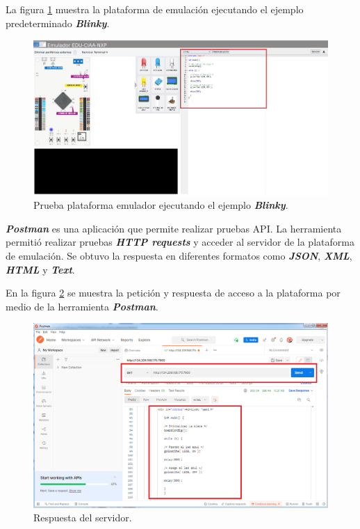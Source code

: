La figura \ref{fig:PlataformaEmuladorBlinky} muestra la plataforma de emulación ejecutando el ejemplo predeterminado \textit{\textbf{Blinky}}.

\begin{figure}[ht]
	\centering
	\includegraphics[scale=.21]{./Figures/PlataformaEmuladorBlinky.png}
	\caption{Prueba plataforma emulador ejecutando el ejemplo \textit{\textbf{Blinky}}.}
	\label{fig:PlataformaEmuladorBlinky}
\end{figure}

\textit{\textbf{Postman}} es una aplicación que permite realizar pruebas API. La herramienta permitió realizar pruebas \textit{\textbf{HTTP requests}} y acceder al servidor de la plataforma de emulación. Se obtuvo la respuesta en diferentes formatos como  \textit{\textbf{JSON}}, \textit{\textbf{XML}}, \textit{\textbf{HTML}} y \textit{\textbf{Text}}.


En la figura \ref{fig:PostmanBlinky2} se muestra la petición y respuesta de acceso a la plataforma por medio de la herramienta \textit{\textbf{Postman}}.

\hfill \break
\hfill \break
\hfill \break
\hfill \break
\hfill \break
\hfill \break
\hfill \break
\hfill \break
\hfill \break
\hfill \break

\begin{figure}[ht]
	\centering
	\includegraphics[scale=.40]{./Figures/PostmanBlinky2.png}
	\caption{Respuesta del servidor.}
	\label{fig:PostmanBlinky2}
\end{figure}


